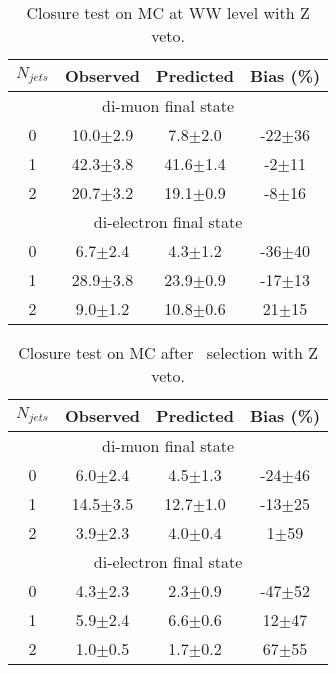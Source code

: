 \begin{table}[!ht]
\begin{center}
\begin{tabular} {|c|ccc|}
\hline
$N_{jets}$  & Observed & Predicted & Bias (\%) \\
\hline 
\hline
\multicolumn{4}{|c|}{di-muon final state} \\
\hline
0 & 10.0$\pm$2.9 &  7.8$\pm$2.0 & -22$\pm$36 \\
1 & 42.3$\pm$3.8 & 41.6$\pm$1.4 &  -2$\pm$11 \\
2 & 20.7$\pm$3.2 & 19.1$\pm$0.9 &  -8$\pm$16 \\
\hline 
\hline
\multicolumn{4}{|c|}{di-electron final state} \\
\hline
0 &  6.7$\pm$2.4 &  4.3$\pm$1.2 & -36$\pm$40 \\
1 & 28.9$\pm$3.8 & 23.9$\pm$0.9 & -17$\pm$13 \\
2 &  9.0$\pm$1.2 & 10.8$\pm$0.6 &  21$\pm$15 \\
\hline 
\end{tabular}
\caption{Closure test on MC at WW level with Z veto.}
\label{tab:mc_closure_ww_zv}
\end{center}
\end{table}



\begin{table}[!ht]
\begin{center}
\begin{tabular} {|c|ccc|}
\hline
$N_{jets}$  & Observed & Predicted & Bias (\%) \\
\hline 
\hline
\multicolumn{4}{|c|}{di-muon final state} \\
\hline
0 &  6.0$\pm$2.4 &  4.5$\pm$1.3 & -24$\pm$46 \\
1 & 14.5$\pm$3.5 & 12.7$\pm$1.0 & -13$\pm$25 \\
2 &  3.9$\pm$2.3 &  4.0$\pm$0.4 &   1$\pm$59 \\
\hline 
\hline
\multicolumn{4}{|c|}{di-electron final state} \\
\hline
0 & 4.3$\pm$2.3 & 2.3$\pm$0.9 & -47$\pm$52 \\
1 & 5.9$\pm$2.4 & 6.6$\pm$0.6 &  12$\pm$47 \\
2 & 1.0$\pm$0.5 & 1.7$\pm$0.2 &  67$\pm$55 \\
\hline 
\end{tabular}
\caption{Closure test on MC after  \GeVcc\ selection with Z veto.}
\label{tab:mc_closure_120_zv}
\end{center}
\end{table}

